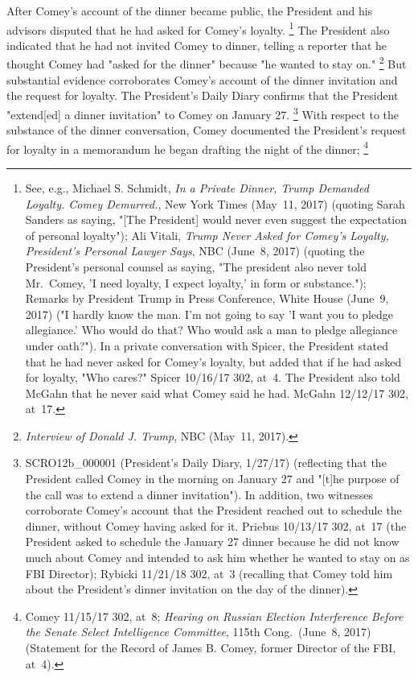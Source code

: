 After Comey's account of the dinner became public, the President and his advisors disputed that he had asked for Comey's loyalty.%
\footnote{See, e.g., Michael S. Schmidt, \textit{In a Private Dinner, Trump Demanded Loyalty. Comey Demurred.}, New York Times (May~11, 2017) (quoting Sarah Sanders as saying, "[The President] would never even suggest the expectation of personal loyalty");
Ali Vitali, \textit{Trump Never Asked for Comey's Loyalty, President's Personal Lawyer Says}, NBC (June~8, 2017) (quoting the President's personal counsel as saying, "The president also never told Mr.~Comey, 'I need loyalty, I expect loyalty,' in form or substance.");
Remarks by President Trump in Press Conference, White House (June~9, 2017) ("I hardly know the man.
I'm not going to say 'I want you to pledge allegiance.'
Who would do that?
Who would ask a man to pledge allegiance under oath?").
In a private conversation with Spicer, the President stated that he had never asked for Comey's loyalty, but added that if he had asked for loyalty, "Who cares?" Spicer 10/16/17 302, at~4.
The President also told McGahn that he never said what Comey said he had. McGahn 12/12/17 302, at~17.}
The President also indicated that he had not invited Comey to dinner, telling a reporter that he thought Comey had "asked for the dinner" because "he wanted to stay on."%
\footnote{\textit{Interview of Donald J. Trump}, NBC (May~11, 2017).}
But substantial evidence corroborates Comey's account of the dinner invitation and the request for loyalty.
The President's Daily Diary confirms that the President "extend[ed] a dinner invitation" to Comey on January 27.%
\footnote{SCRO12b\_000001 (President's Daily Diary, 1/27/17) (reflecting that the President called Comey in the morning on January 27 and "[t]he purpose of the call was to extend a dinner invitation").
In addition, two witnesses corroborate Comey's account that the President reached out to schedule the dinner, without Comey having asked for it.
Priebus 10/13/17 302, at~17 (the President asked to schedule the January 27 dinner because he did not know much about Comey and intended to ask him whether he wanted to stay on as FBI Director);
Rybicki 11/21/18 302, at~3 (recalling that Comey told him about the President's dinner invitation on the day of the dinner).}
With respect to the substance of the dinner conversation, Comey documented the President's request for loyalty in a memorandum he began drafting the night of the dinner;%
\footnote{Comey 11/15/17 302, at~8;
\textit{Hearing on Russian Election Interference Before the Senate Select Intelligence Committee}, 115th Cong.\ (June~8, 2017) (Statement for the Record of James B. Comey, former Director of the FBI, at~4).}
